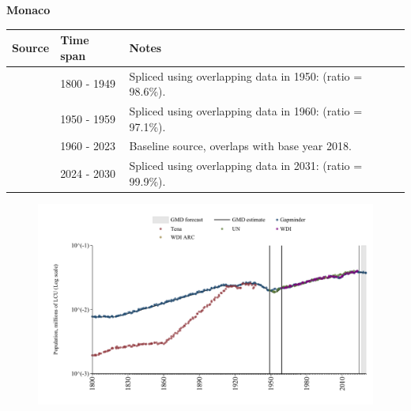 \documentclass[12pt,a4paper,landscape]{article}
\begin{document}
\begin{adjustbox}{max totalsize={\paperwidth}{\paperheight},center}
\begin{minipage}[t][\textheight][t]{\textwidth}
\vspace*{0.5cm}
{}
\begin{center}
{\Large\bfseries Monaco}
\end{center}
\vspace{0.5cm}
\begin{table}[H]
\centering
\small
\begin{tabular}{|l|l|l|}
\hline
\textbf{Source} & \textbf{Time span} & \textbf{Notes} \\
\hline
\rowcolor{white}\cite{Gapminder}& 1800 - 1949 &Spliced using overlapping data in 1950: (ratio = 98.6\%).\\
\rowcolor{lightgray}\cite{UN}& 1950 - 1959 &Spliced using overlapping data in 1960: (ratio = 97.1\%).\\
\rowcolor{white}\cite{WDI}& 1960 - 2023 &Baseline source, overlaps with base year 2018.\\
\rowcolor{lightgray}\cite{Gapminder}& 2024 - 2030 &Spliced using overlapping data in 2031: (ratio = 99.9\%).\\
\hline
\end{tabular}
\end{table}
\begin{figure}[H]
\centering
\includegraphics[width=\textwidth,height=0.6\textheight,keepaspectratio]{graphs/MCO_pop.pdf}
\end{figure}
\end{minipage}
\end{adjustbox}
\end{document}

